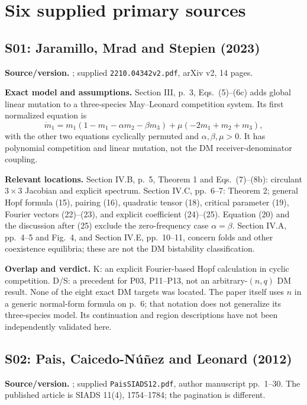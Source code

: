 \section{Six supplied primary sources}
\label{sec:core-sources}

\subsection{S01: Jaramillo, Mrad and Stepien (2023)}
\label{src:jms}
\textbf{Source/version.} \cite{JaramilloMradStepien2023}; supplied
\texttt{2210.04342v2.pdf}, arXiv v2, 14 pages.

\textbf{Exact model and assumptions.} Section III, p.~3, Eqs.~(5)--(6c)
adds global linear mutation to a three-species May--Leonard competition
system. Its first normalized equation is
\[
 \dot m_1=m_1(1-m_1-\alpha m_2-\beta m_3)
            +\mu(-2m_1+m_2+m_3),
\]
with the other two equations cyclically permuted and
$\alpha,\beta,\mu>0$. It has polynomial competition and linear mutation,
not the DM receiver-denominator coupling.

\textbf{Relevant locations.} Section IV.B, p.~5, Theorem 1 and
Eqs.~(7)--(8b): circulant $3\times3$ Jacobian and explicit spectrum.
Section IV.C, pp.~6--7: Theorem 2; general Hopf formula (15), pairing (16),
quadratic tensor (18), critical parameter (19), Fourier vectors
(22)--(23), and explicit coefficient (24)--(25). Equation (20) and the
discussion after (25) exclude the zero-frequency case $\alpha=\beta$.
Section IV.A, pp.~4--5 and Fig.~4, and Section IV.E, pp.~10--11, concern
folds and other coexistence equilibria; these are not the DM bistability
classification.

\textbf{Overlap and verdict.} K: an explicit Fourier-based Hopf calculation
in cyclic competition. D/S: a precedent for P03, P11--P13, not an
arbitrary-$(n,q)$ DM result. None of the eight exact DM targets was located.
The paper itself uses $n$ in a generic normal-form formula on p.~6;
that notation does not generalize its three-species model. Its continuation
and region descriptions have not been independently validated here.

\subsection{S02: Pais, Caicedo-N\'{u}\~{n}ez and Leonard (2012)}
\label{src:pais}
\textbf{Source/version.} \cite{PaisCaicedoLeonard2012}; supplied
\texttt{PaisSIADS12.pdf}, author manuscript pp.~1--30. The published article
is SIADS 11(4), 1754--1784; the pagination is different.

